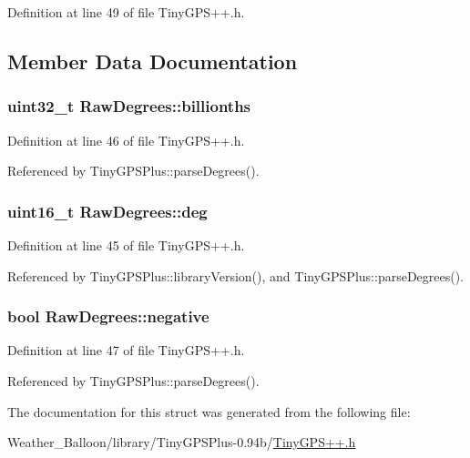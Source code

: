 Definition at line 49 of file Tiny\+G\+P\+S++.\+h.



\subsection{Member Data Documentation}
\subsubsection[{\texorpdfstring{billionths}{billionths}}]{\setlength{\rightskip}{0pt plus 5cm}uint32\+\_\+t Raw\+Degrees\+::billionths}\hypertarget{struct_raw_degrees_a13564009c60e20dbf03b158114d1c0e2}{}\label{struct_raw_degrees_a13564009c60e20dbf03b158114d1c0e2}


Definition at line 46 of file Tiny\+G\+P\+S++.\+h.



Referenced by Tiny\+G\+P\+S\+Plus\+::parse\+Degrees().

\subsubsection[{\texorpdfstring{deg}{deg}}]{\setlength{\rightskip}{0pt plus 5cm}uint16\+\_\+t Raw\+Degrees\+::deg}\hypertarget{struct_raw_degrees_a11831d9220f303bd716d9412af28e84e}{}\label{struct_raw_degrees_a11831d9220f303bd716d9412af28e84e}


Definition at line 45 of file Tiny\+G\+P\+S++.\+h.



Referenced by Tiny\+G\+P\+S\+Plus\+::library\+Version(), and Tiny\+G\+P\+S\+Plus\+::parse\+Degrees().

\subsubsection[{\texorpdfstring{negative}{negative}}]{\setlength{\rightskip}{0pt plus 5cm}bool Raw\+Degrees\+::negative}\hypertarget{struct_raw_degrees_a39c31d2d0332155a4d2c975cec0a796f}{}\label{struct_raw_degrees_a39c31d2d0332155a4d2c975cec0a796f}


Definition at line 47 of file Tiny\+G\+P\+S++.\+h.



Referenced by Tiny\+G\+P\+S\+Plus\+::parse\+Degrees().



The documentation for this struct was generated from the following file\+:\begin{DoxyCompactItemize}
\item 
Weather\+\_\+\+Balloon/library/\+Tiny\+G\+P\+S\+Plus-\/0.\+94b/\hyperlink{_tiny_g_p_s_09_09_8h}{Tiny\+G\+P\+S++.\+h}\end{DoxyCompactItemize}
